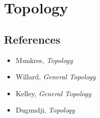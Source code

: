 \section{Topology}
\subsection*{References}
\begin{itemize}
    \item Munkres, \emph{Topology}
    \item Willard, \emph{General Topology}
    \item Kelley, \emph{General Topology}
    \item Dugundji, \emph{Topology}
\end{itemize}
